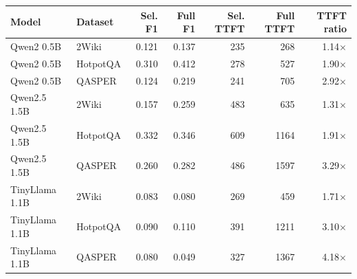 \begin{tabular}{llrrrrr}
\toprule
Model & Dataset & Sel. F1 & Full F1 & Sel. TTFT & Full TTFT & TTFT ratio \\
\midrule
Qwen2 0.5B & 2Wiki & 0.121 & 0.137 & 235 & 268 & 1.14$\times$ \\
Qwen2 0.5B & HotpotQA & 0.310 & 0.412 & 278 & 527 & 1.90$\times$ \\
Qwen2 0.5B & QASPER & 0.124 & 0.219 & 241 & 705 & 2.92$\times$ \\
Qwen2.5 1.5B & 2Wiki & 0.157 & 0.259 & 483 & 635 & 1.31$\times$ \\
Qwen2.5 1.5B & HotpotQA & 0.332 & 0.346 & 609 & 1164 & 1.91$\times$ \\
Qwen2.5 1.5B & QASPER & 0.260 & 0.282 & 486 & 1597 & 3.29$\times$ \\
TinyLlama 1.1B & 2Wiki & 0.083 & 0.080 & 269 & 459 & 1.71$\times$ \\
TinyLlama 1.1B & HotpotQA & 0.090 & 0.110 & 391 & 1211 & 3.10$\times$ \\
TinyLlama 1.1B & QASPER & 0.080 & 0.049 & 327 & 1367 & 4.18$\times$ \\
\bottomrule
\end{tabular}
